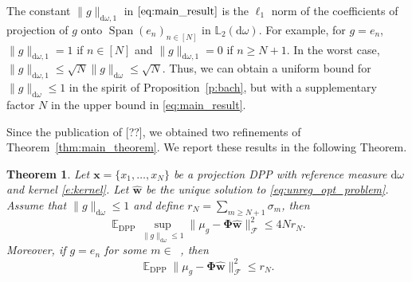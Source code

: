 \documentclass[twoside,11pt]{book}
\newtheorem{theorem}{Theorem}
\DeclareMathOperator{\Span}{\mathrm{Span}}
\DeclareMathOperator{\DPP}{\mathrm{DPP}}
\DeclareMathOperator{\EX}{\mathbb{E}}
\DeclareMathOperator{\Ns}{\mathbb{N}^{*}}
\begin{document}
The constant $\|g\|_{\mathrm{d}\omega,1}$ in $\eqref{eq:main_result}$ is the $\ell_1$ norm of the coefficients of projection of $g$ onto $\Span(e_{n})_{n \in [N]}$ in $\mathbb{L}_{2}(\mathrm{d}\omega)$. For example, for $g = e_{n}$, $\|g\|_{\mathrm{d}\omega,1} = 1$ if $n \in [N]$ and $\|g\|_{\mathrm{d}\omega,1} = 0$ if $n \geq N+1$. In the worst case, $\|g\|_{\mathrm{d}\omega,1} \leq \sqrt{N} \|g\|_{\mathrm{d}\omega} \leq \sqrt{N}$.
Thus, we can obtain a uniform bound for $\|g\|_{\mathrm{d}\omega}\leq 1$ in the spirit of Proposition~\ref{p:bach}, but with a supplementary factor $N$ in the upper bound in \eqref{eq:main_result}.

Since the publication of [??], we obtained two refinements of Theorem~\ref{thm:main_theorem}. We report these results in the following Theorem.

\begin{theorem}\label{thm:main_theorem_refined}
Let $\bm{x} = \{x_{1}, \dots , x_{N}\}$ be a projection DPP with reference measure $\mathrm{d}\omega$ and kernel \eqref{e:kernel}. Let $\hat{\bm{w}}$ be the unique solution to \eqref{eq:unreg_opt_problem}. Assume that $\|g\|_{\mathrm{d}\omega} \leq 1$ and define $r_{N} = \sum\limits_{m \geq N+1} \sigma_{m}$, then
\begin{equation}\label{eq:main_result_refined}
\EX_{\DPP} \sup\limits_{\|g\|_{\mathrm{d}\omega} \leq 1}\|\mu_{g} - \bm{\Phi}\hat{\bm{w}}\|_{\mathcal{F}}^{2}  \leq 4 Nr_{N}.
\end{equation}
Moreover, if $g = e_{n}$ for some $m \in \Ns$, then
\begin{equation}\label{eq:main_result_refined_eigfunction}
\EX_{\DPP} \|\mu_{g} - \bm{\Phi}\hat{\bm{w}}\|_{\mathcal{F}}^{2}  \leq r_{N}.
\end{equation}
\end{theorem}
\end{document}
